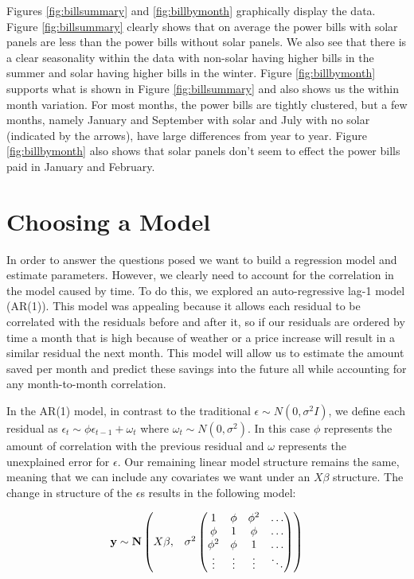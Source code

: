 \documentclass{svproc}
\begin{document}
Figures \ref{fig:billsummary} and \ref{fig:billbymonth} graphically display the data. Figure \ref{fig:billsummary} clearly shows that on average the power bills with solar panels are less than the power bills without solar panels. We also see that there is a clear seasonality within the data with non-solar having higher bills in the summer and solar having higher bills in the winter. Figure \ref{fig:billbymonth} supports what is shown in Figure \ref{fig:billsummary} and also shows us the within month variation. For most months, the power bills are tightly clustered, but a few months, namely January and September with solar and July with no solar (indicated by the arrows), have large differences from year to year. Figure \ref{fig:billbymonth} also shows that solar panels don't seem to effect the power bills paid in January and February. 



\section{Choosing a Model}
In order to answer the questions posed we want to build a regression model and estimate parameters. However, we clearly need to account for the correlation in the model caused by time. To do this, we explored an auto-regressive lag-1 model (AR(1)). This model was appealing because it allows each residual to be correlated with the residuals before and after it, so if our residuals are ordered by time a month that is high because of weather or a price increase will result in a similar residual the next month. This model will allow us to estimate the amount saved per month and predict these savings into the future all while accounting for any month-to-month correlation. 

In the AR(1) model, in contrast to the traditional $\epsilon \sim N(0, \sigma^2I)$, we define each residual as $\epsilon_t \sim \phi \epsilon_{t-1} + \omega_t$ where $\omega_t \sim N(0, \sigma^2)$. In this case $\phi$ represents the amount of correlation with the previous residual and $\omega$ represents the unexplained error for $\epsilon$. Our remaining linear model structure remains the same, meaning that we can include any covariates we want under an $X\beta$ structure. The change in structure of the $\epsilon$s results in the following model:

\begin{equation}
\bf{y} \sim N
\begin{pmatrix} X\beta, & \sigma^2 \begin{pmatrix}
1 & \phi & \phi^2 &\hdots\\
\phi & 1& \phi &\hdots\\
\phi^2 & \phi & 1&\hdots \\
\vdots & \vdots & \vdots &\ddots
\end{pmatrix}
\end{pmatrix}
\label{model}
\end{equation}
\end{document}
